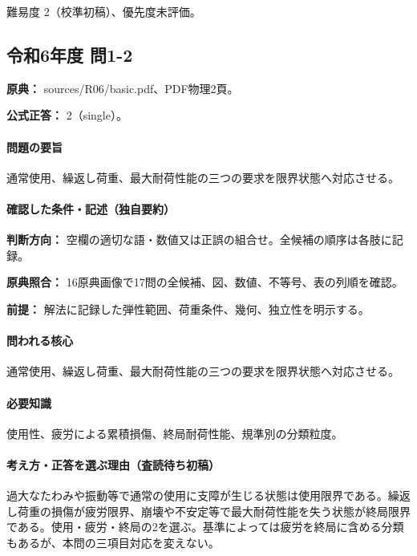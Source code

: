\par 難易度 2（校準初稿）、優先度未評価。

\subsection{令和6年度 問1-2}
\label{q:r06-reg-basic-1-2}

\noindent\textbf{原典：} sources/R06/basic.pdf、PDF物理2頁。

\textbf{公式正答：} 2（single）。

\paragraph{問題の要旨} 通常使用、繰返し荷重、最大耐荷性能の三つの要求を限界状態へ対応させる。

\paragraph{確認した条件・記述（独自要約）}\mbox{}\par

\noindent\textbf{判断方向：} 空欄の適切な語・数値又は正誤の組合せ。全候補の順序は各肢に記録。\par

\noindent\textbf{原典照合：} 16原典画像で17問の全候補、図、数値、不等号、表の列順を確認。\par

\noindent\textbf{前提：} 解法に記録した弾性範囲、荷重条件、幾何、独立性を明示する。\par

\paragraph{問われる核心} 通常使用、繰返し荷重、最大耐荷性能の三つの要求を限界状態へ対応させる。

\paragraph{必要知識} 使用性、疲労による累積損傷、終局耐荷性能、規準別の分類粒度。

\paragraph{考え方・正答を選ぶ理由（査読待ち初稿）} 過大なたわみや振動等で通常の使用に支障が生じる状態は使用限界である。繰返し荷重の損傷が疲労限界、崩壊や不安定等で最大耐荷性能を失う状態が終局限界である。使用・疲労・終局の2を選ぶ。基準によっては疲労を終局に含める分類もあるが、本問の三項目対応を変えない。

